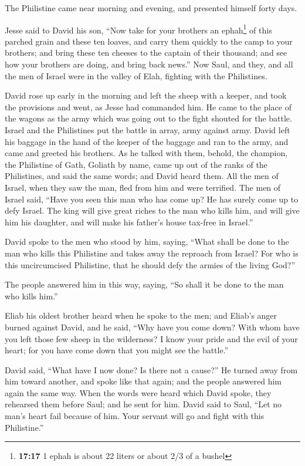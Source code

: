  The Philistine came near morning and evening, and
presented himself forty days.

 Jesse said to David his son, ``Now take for your
brothers an ephah\footnote{\textbf{17:17} 1 ephah is about 22 liters or
  about 2/3 of a bushel} of this parched grain and these ten loaves, and
carry them quickly to the camp to your brothers;  and
bring these ten cheeses to the captain of their thousand; and see how
your brothers are doing, and bring back news.''  Now
Saul, and they, and all the men of Israel were in the valley of Elah,
fighting with the Philistines.

 David rose up early in the morning and left the sheep
with a keeper, and took the provisions and went, as Jesse had commanded
him. He came to the place of the wagons as the army which was going out
to the fight shouted for the battle.  Israel and the
Philistines put the battle in array, army against army. 
David left his baggage in the hand of the keeper of the baggage and ran
to the army, and came and greeted his brothers.  As he
talked with them, behold, the champion, the Philistine of Gath, Goliath
by name, came up out of the ranks of the Philistines, and said the same
words; and David heard them.  All the men of Israel, when
they saw the man, fled from him and were terrified.  The
men of Israel said, ``Have you seen this man who has come up? He has
surely come up to defy Israel. The king will give great riches to the
man who kills him, and will give him his daughter, and will make his
father's house tax-free in Israel.''

 David spoke to the men who stood by him, saying, ``What
shall be done to the man who kills this Philistine and takes away the
reproach from Israel? For who is this uncircumcised Philistine, that he
should defy the armies of the living God?''

 The people answered him in this way, saying, ``So shall
it be done to the man who kills him.''

 Eliab his oldest brother heard when he spoke to the men;
and Eliab's anger burned against David, and he said, ``Why have you come
down? With whom have you left those few sheep in the wilderness? I know
your pride and the evil of your heart; for you have come down that you
might see the battle.''

 David said, ``What have I now done? Is there not a
cause?''  He turned away from him toward another, and
spoke like that again; and the people answered him again the same way.
 When the words were heard which David spoke, they
rehearsed them before Saul; and he sent for him.  David
said to Saul, ``Let no man's heart fail because of him. Your servant
will go and fight with this Philistine.''

